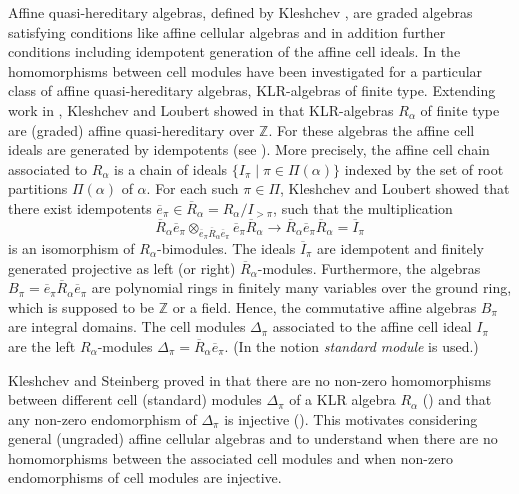 \documentclass[oneside, a4paper, 11pt]{amsart}
\newcommand{\ZZ}{\mathbb{Z}}
\begin{document}
Affine quasi-hereditary algebras, defined by Kleshchev \cite{Kleshchev},
are graded algebras satisfying conditions like affine cellular algebras
and in addition further conditions including idempotent generation of the
affine cell ideals. In \cite{KS} the homomorphisms between cell
modules have been investigated for a particular class of affine
quasi-hereditary algebras, KLR-algebras of finite type. Extending work in
\cite{KLM}, Kleshchev and Loubert showed in  \cite{KL} that KLR-algebras $R_{\alpha}$ of finite type are (graded) affine quasi-hereditary over $\ZZ$. For these algebras the affine cell ideals are generated by idempotents (see \cite[Section 4]{KL}).
More precisely, the affine cell chain associated to $R_{\alpha}$ is a chain of ideals $\{I_\pi \mid \pi \in \Pi(\alpha)\}$ indexed by the set of root partitions $\Pi(\alpha)$ of $\alpha$. For each such $\pi \in \Pi$, Kleshchev and Loubert showed that there exist idempotents $\overline{e}_\pi \in \overline{R}_\alpha = R_\alpha/I_{>\pi}$, such that the multiplication         
$$\overline{R}_\alpha \overline{e}_\pi \otimes_{\overline{e}_\pi \overline{R}_\alpha\overline{e}_\pi}  \overline{e}_\pi \overline{R}_\alpha \longrightarrow  \overline{R}_\alpha\overline{e}_\pi \overline{R}_\alpha = \overline{I}_\pi$$
is an isomorphism of $R_{\alpha}$-bimodules. The ideals $\overline{I}_\pi$  are idempotent and finitely generated projective as left (or right) $\overline{R}_\alpha$-modules. Furthermore, the algebras $B_\pi ={\overline{e}_\pi \overline{R}_\alpha\overline{e}_\pi}$ are polynomial rings in finitely many variables over the ground ring, which is supposed to be $\ZZ$ or a field. Hence, the commutative affine algebras $B_\pi$ are integral domains. The cell modules $\Delta_\pi$ associated to the affine cell ideal $I_\pi$ are the left $R_\alpha$-modules $\Delta_\pi = \overline{R}_\alpha \overline{e}_\pi$. (In \cite{KS} the notion \emph{standard module} is used.) 

Kleshchev and Steinberg proved in \cite{KS} that there are no non-zero homomorphisms between different cell (standard) modules $\Delta_\pi$ of a KLR algebra $R_\alpha$ (\cite[Theorem A]{KS}) and that any non-zero endomorphism of $\Delta_\pi$ is injective (\cite[Theorem B]{KS}).  This motivates considering general
(ungraded) affine cellular algebras and to understand when there are no
homomorphisms between the associated cell modules and when non-zero
endomorphisms of cell modules are injective.
\medskip
\end{document}
